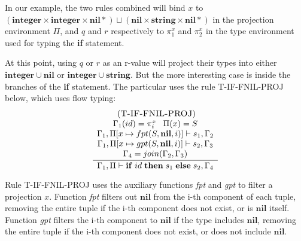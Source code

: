\documentclass{sigplanconf}
\newcommand{\Nil}{\mathbf{nil}}
\newcommand{\Integer}{\mathbf{integer}}
\newcommand{\String}{\mathbf{string}}
\newcommand{\mylabel}[1]{\; (\textsc{#1})}
\newcommand{\env}{\Gamma}
\newcommand{\penv}{\Pi}
\begin{document}
In our example, the two rules combined will bind $x$ to
$(\Integer \times \Integer \times \Nil{*}) \sqcup (\Nil \times \String \times \Nil{*})$ in the projection environment $\Pi$,
and $q$ and $r$ respectively to $\pi_{1}^{x}$ and $\pi_{2}^{x}$
in the type environment used for typing the {\bf if} statement.

At this point, using $q$ or $r$ as an r-value will project
their types into either $\Integer \cup \Nil$ or $\Integer \cup \String$. But the more interesting case is inside the
branches of the {\bf if} statement. The particular uses the rule {\sc T-IF-FNIL-PROJ} below, which uses flow typing:
\[
\begin{array}{c}
\mylabel{T-IF-FNIL-PROJ}\\
\dfrac{\begin{array}{c}
       \env_{1}(id) = \pi_{i}^{x} \;\;\; \penv(x) = S\\
       \env_{1}, \penv[x \mapsto fpt(S,\Nil,i)] \vdash s_{1}, \env_{2} \\
       \env_{1}, \penv[x \mapsto gpt(S,\Nil,i)] \vdash s_{2}, \env_{3} \\
       \env_{4} = join(\env_{2}, \env_{3}) 
      \end{array}}
      {\env_{1}, \penv \vdash \mathbf{if} \; id \; \mathbf{then} \; s_{1} \; \mathbf{else} \; s_{2}, \env_{4}}
\end{array}
\]

Rule \textsc{T-IF-FNIL-PROJ} uses the auxiliary functions \emph{fpt} and \emph{gpt}
to filter a projection $x$. Function {\em fpt} filters out $\Nil$ from the i-th
component of each tuple, removing the entire tuple if the i-th
component does not exist, or is $\Nil$ itself. Function {\em gpt}
filters the i-th component to $\Nil$ if the type includes
$\Nil$, removing the entire tuple if the i-th component does
not exist, or does not include $\Nil$.
\end{document}
